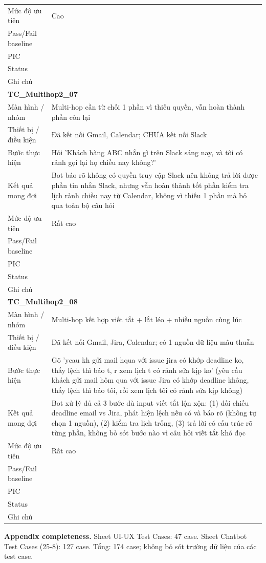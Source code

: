 \documentclass[12pt,a4paper]{article}
\begin{document}
\begin{longtable}{p{3.0cm}p{11.5cm}}
Mức độ ưu tiên & Cao \\
Pass/Fail baseline &  \\
PIC &  \\
Status &  \\
Ghi chú &  \\
\midrule
\multicolumn{2}{l}{\textbf{TC\_Multihop2\_07}} \\
Màn hình / nhóm & Multi-hop cần từ chối 1 phần vì thiếu quyền, vẫn hoàn thành phần còn lại \\
Thiết bị / điều kiện & Đã kết nối Gmail, Calendar; CHƯA kết nối Slack \\
Bước thực hiện & Hỏi 'Khách hàng ABC nhắn gì trên Slack sáng nay, và tôi có rảnh gọi lại họ chiều nay không?' \\
Kết quả mong đợi & Bot báo rõ không có quyền truy cập Slack nên không trả lời được phần tin nhắn Slack, nhưng vẫn hoàn thành tốt phần kiểm tra lịch rảnh chiều nay từ Calendar, không vì thiếu 1 phần mà bỏ qua toàn bộ câu hỏi \\
Mức độ ưu tiên & Rất cao \\
Pass/Fail baseline &  \\
PIC &  \\
Status &  \\
Ghi chú &  \\
\midrule
\multicolumn{2}{l}{\textbf{TC\_Multihop2\_08}} \\
Màn hình / nhóm & Multi-hop kết hợp viết tắt + lắt léo + nhiều nguồn cùng lúc \\
Thiết bị / điều kiện & Đã kết nối Gmail, Jira, Calendar; có 1 nguồn dữ liệu mâu thuẫn \\
Bước thực hiện & Gõ 'ycau kh gửi mail hqua với issue jira có khớp deadline ko, thấy lệch thì báo t, r xem lịch t có rảnh sửa kịp ko' (yêu cầu khách gửi mail hôm qua với issue Jira có khớp deadline không, thấy lệch thì báo tôi, rồi xem lịch tôi có rảnh sửa kịp không) \\
Kết quả mong đợi & Bot xử lý đủ cả 3 bước dù input viết tắt lộn xộn: (1) đối chiếu deadline email vs Jira, phát hiện lệch nếu có và báo rõ (không tự chọn 1 nguồn), (2) kiểm tra lịch trống, (3) trả lời có cấu trúc rõ từng phần, không bỏ sót bước nào vì câu hỏi viết tắt khó đọc \\
Mức độ ưu tiên & Rất cao \\
Pass/Fail baseline &  \\
PIC &  \\
Status &  \\
Ghi chú &  \\
\midrule
\bottomrule
\end{longtable}
\noindent\textbf{Appendix completeness.} Sheet UI-UX Test Cases: 47 case. Sheet Chatbot Test Cases (25-8): 127 case. Tổng: 174 case; không bỏ sót trường dữ liệu của các test case.
\end{document}
